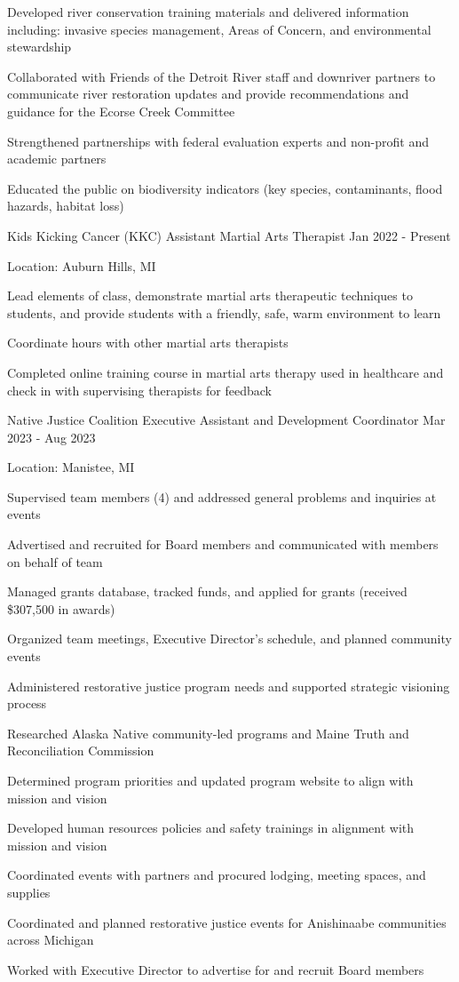 \documentclass{../styles/cv}
\begin{document}
    \item Developed river conservation training materials and delivered information including: invasive species management, Areas of Concern, and environmental stewardship
    \item Collaborated with Friends of the Detroit River staff and downriver partners to communicate river restoration updates and provide recommendations and guidance for the Ecorse Creek Committee
    \item Strengthened partnerships with federal evaluation experts and non-profit and academic partners
    \item Educated the public on biodiversity indicators (key species, contaminants, flood hazards, habitat loss)
\resumesublistend

\subsectionpositiondate
    {Kids Kicking Cancer (KKC)}
    {Assistant Martial Arts Therapist}
    {Jan 2022 - Present}
\resumesublistbegin
    \item Location: Auburn Hills, MI
    \item Lead elements of class, demonstrate martial arts therapeutic techniques to students, and provide students with a friendly, safe, warm environment to learn
    \item Coordinate hours with other martial arts therapists
    \item Completed online training course in martial arts therapy used in healthcare and check in with supervising therapists for feedback
\resumesublistend

\subsectionpositiondate
    {Native Justice Coalition}
    {Executive Assistant and Development Coordinator}
    {Mar 2023 - Aug 2023}
\resumesublistbegin
    \item Location: Manistee, MI
    \item Supervised team members (4) and addressed general problems and inquiries at events
    \item Advertised and recruited for Board members and communicated with members on behalf of team
    \item Managed grants database, tracked funds, and applied for grants (received \$307,500 in awards)
    \item Organized team meetings, Executive Director's schedule, and planned community events
    \item Administered restorative justice program needs and supported strategic visioning process
    \item Researched Alaska Native community-led programs and Maine Truth and Reconciliation Commission
    \item Determined program priorities and updated program website to align with mission and vision
    \item Developed human resources policies and safety trainings in alignment with mission and vision
    \item Coordinated events with partners and procured lodging, meeting spaces, and supplies
    \item Coordinated and planned restorative justice events for Anishinaabe communities across Michigan
    \item Worked with Executive Director to advertise for and recruit Board members
\resumesublistend
\end{document}
